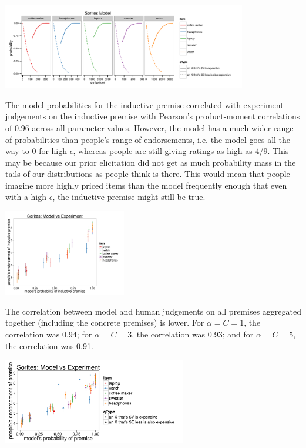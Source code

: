 \documentclass[10pt]{article}
\begin{document}
  \includegraphics[width=0.8\textwidth]{sorites_model_alpha1_cost1.pdf}
  
  The model probabilities for the inductive premise correlated with experiment judgements on the inductive premise with Pearson's product-moment correlations of 0.96 across all parameter values. However, the model has a much wider range of probabilities than people's range of endorsements, i.e. the model goes all the way to 0 for high $\epsilon$, whereas people are still giving ratings as high as 4/9. This may be because our prior elicitation did not get as much probability mass in the tails of our distributions as people think is there. This would mean that people imagine more highly priced items than the model frequently enough that even with a high $\epsilon$, the inductive premise might still be true.
  
  \includegraphics[width=0.4\textwidth]{sorites-model-vs-people_alpha1_cost1.pdf}
  
  The correlation between model and human judgements on all premises aggregated together (including the concrete premises) is lower. For $\alpha=C=1$, the correlation was 0.94; for $\alpha=C=3$, the correlation was 0.93; and for $\alpha=C=5$, the correlation was 0.91.
  
  \includegraphics[width=0.6\textwidth]{sorites-model-vs-people_all_alpha1_cost1.pdf}
  
\end{document}
